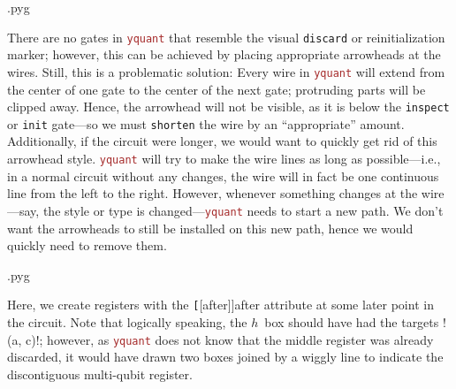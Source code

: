 \documentclass{scrartcl}
\makeatletter
\newenvironment{codeexample}{%
   \VerbatimEnvironment%
   \let\FVB@VerbatimOut\minted@FVB@VerbatimOut
   \let\FVE@VerbatimOut\minted@FVE@VerbatimOut
   \minted@configlang{tex}%
   \minted@fvset
   \begin{VerbatimOut}[codes={\catcode`\^^I=12},firstline,lastline]{\minted@jobname.pyg}%
}{
   \end{VerbatimOut}%
   \minted@langlinenoson%
   \savebox\codeexamplebox{ \minted@jobname.pyg}%
   \ifdim\wd\codeexamplebox>\dimexpr.5\linewidth-3mm\relax%
      \wd\codeexamplebox=.5\linewidth%
   \else%
      \wd\codeexamplebox=\dimexpr\wd\codeexamplebox+3mm\relax%
   \fi%
   \noindent\begin{minipage}{\wd\codeexamplebox}%
      \centering%
      \usebox\codeexamplebox%
   \end{minipage}%
   \begin{minipage}{\dimexpr\linewidth-\wd\codeexamplebox\relax}%
      \expandafter\minted@pygmentize\expandafter{\minted@lang}%
   \end{minipage}%
   \minted@langlinenosoff%
   \par%
}
\def\pkg#1{\textcolor{brown}{\texttt{#1}}}
\def\ttlink{\link\texttt}
\def\Yquant{\pkg{yquant}}
\makeatother
\begin{document}
            \begin{example}
               \begin{codeexample}
               \end{codeexample}
               There are no gates in \Yquant{} that resemble the visual \ttlink{discard} or reinitialization marker; however, this can be achieved by placing appropriate arrowheads at the wires.
               Still, this is a problematic solution: Every wire in \Yquant{} will extend from the center of one gate to the center of the next gate; protruding parts will be clipped away.
               Hence, the arrowhead will not be visible, as it is below the \ttlink{inspect} or \ttlink{init} gate---so we must \texttt{shorten} the wire by an ``appropriate'' amount.
               Additionally, if the circuit were longer, we would want to quickly get rid of this arrowhead style.
               \Yquant{} will try to make the wire lines as long as possible---i.e., in a normal circuit without any changes, the wire will in fact be one continuous line from the left to the right.
               However, whenever something changes at the wire---say, the style or type is changed---\Yquant{} needs to start a new path.
               We don't want the arrowheads to still be installed on this new path, hence we would quickly need to remove them.
            \end{example}

            \begin{example}
               \begin{codeexample}
               \end{codeexample}
               Here, we create registers with the \ttlink[{[after]}]{after} attribute at some later point in the circuit.
               Note that logically speaking, the $h$~box should have had the targets \yquant!(a, c)!; however, as \Yquant{} does not know that the middle register was already discarded, it would have drawn two boxes joined by a wiggly line to indicate the discontiguous multi\hyp qubit register.
            \end{example}
\end{document}
